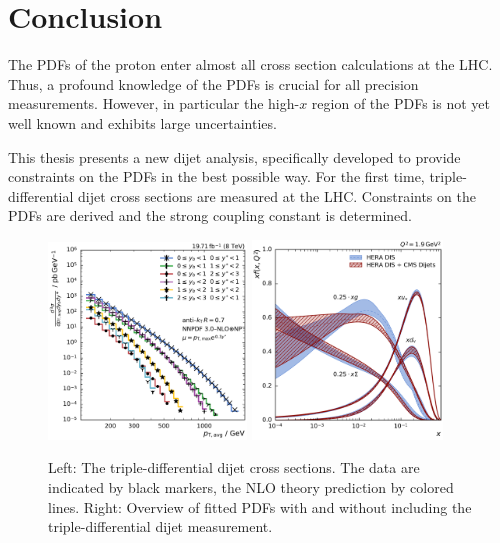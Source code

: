 
\chapter{Conclusion}

The PDFs of the proton enter almost all cross section calculations at the LHC. Thus, a
profound knowledge of the PDFs is crucial for all precision measurements.
However, in particular the high-$x$ region of the PDFs is not yet well known and
exhibits large uncertainties.

This thesis presents a new dijet analysis, specifically developed to provide
constraints on the PDFs in the best possible way. For the first time,
triple-differential dijet cross sections are measured at the LHC.
Constraints on the PDFs are derived and the strong coupling constant is
determined.
\\[-6pt]
\begin{figure}[bt]
    \centering
    \includegraphics[width=0.47\textwidth]{figures/measurement/ptavg_spectrum.pdf}\hfill
    \includegraphics[width=0.45\textwidth]{figures/pdf_constraints/pdfcomp_direct_overview_1.9.pdf}
    \caption[Summary plot of results]{Left:
    The triple-differential dijet cross sections. The data are indicated by black
    markers, the NLO theory prediction by colored lines. Right: Overview of
    fitted PDFs with and without including the triple-differential dijet
    measurement.}
    \label{fig:conclusion}
\end{figure}

